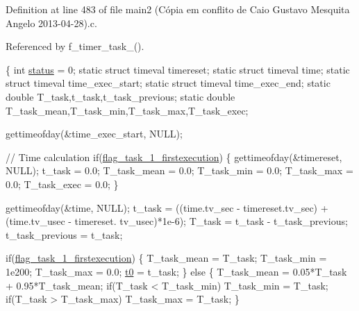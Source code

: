 Definition at line 483 of file main2 (\-Cópia em conflito de Caio Gustavo Mesquita Angelo 2013-\/04-\/28).\-c.



Referenced by f\-\_\-timer\-\_\-task\-\_().


\begin{DoxyCode}
\{
    \textcolor{keywordtype}{int} \hyperlink{communication_01_07C_xC3_xB3pia_01em_01conflito_01de_01Andr_xC3_xA9_01Carvalho_012013-04-26_08_8c_a6e27f49150e9a14580fb313cc2777e00}{status} = 0;
    \textcolor{keyword}{static} \textcolor{keyword}{struct }timeval timereset;
    \textcolor{keyword}{static} \textcolor{keyword}{struct }timeval time;
    \textcolor{keyword}{static} \textcolor{keyword}{struct }timeval time\_exec\_start;
    \textcolor{keyword}{static} \textcolor{keyword}{struct }timeval time\_exec\_end;
    \textcolor{keyword}{static} \textcolor{keywordtype}{double} T\_task,t\_task,t\_task\_previous;
    \textcolor{keyword}{static} \textcolor{keywordtype}{double} T\_task\_mean,T\_task\_min,T\_task\_max,T\_task\_exec;

    gettimeofday(&time\_exec\_start, NULL);

    \textcolor{comment}{// Time calculation}
    \textcolor{keywordflow}{if}(\hyperlink{main2_01_07C_xC3_xB3pia_01em_01conflito_01de_01Caio_01Gustavo_01Mesquita_01Angelo_012013-04-28_08_8c_a764ebf75ba887a9ecf7bf8fe124960e0}{flag\_task\_1\_firstexecution})
    \{
        gettimeofday(&timereset, NULL);
        t\_task = 0.0;
        T\_task\_mean = 0.0;
        T\_task\_min = 0.0;
        T\_task\_max = 0.0;
        T\_task\_exec = 0.0;
    \}

    gettimeofday(&time, NULL);
    t\_task = ((time.tv\_sec - timereset.tv\_sec) + (time.tv\_usec - timereset.
      tv\_usec)*1e-6);
    T\_task = t\_task - t\_task\_previous;
    t\_task\_previous = t\_task;

    \textcolor{keywordflow}{if}(\hyperlink{main2_01_07C_xC3_xB3pia_01em_01conflito_01de_01Caio_01Gustavo_01Mesquita_01Angelo_012013-04-28_08_8c_a764ebf75ba887a9ecf7bf8fe124960e0}{flag\_task\_1\_firstexecution})
    \{
        T\_task\_mean = T\_task;
        T\_task\_min  = 1e200;
        T\_task\_max  = 0.0;
        \hyperlink{main2_01_07C_xC3_xB3pia_01em_01conflito_01de_01Caio_01Gustavo_01Mesquita_01Angelo_012013-04-28_08_8c_a86c2efd6da48b362806cdbb5b1e711d8}{t0} = t\_task;
    \}
    \textcolor{keywordflow}{else}
    \{
        T\_task\_mean = 0.05*T\_task + 0.95*T\_task\_mean;
        \textcolor{keywordflow}{if}(T\_task < T\_task\_min) T\_task\_min  = T\_task;
        \textcolor{keywordflow}{if}(T\_task > T\_task\_max) T\_task\_max  = T\_task;
    \}


\end{DoxyCode}
